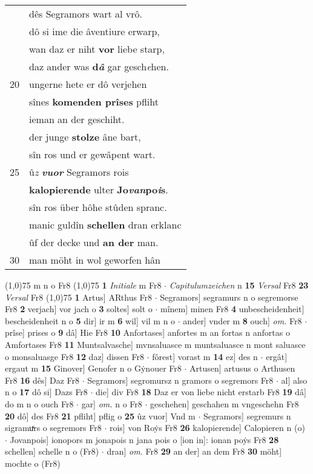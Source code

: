 \documentclass[8pt,a4paper,notitlepage]{article}
\begin{document}
\begin{table}[ht]
\begin{minipage}[t]{0.5\linewidth}
\begin{tabular}{rl}
 & dês Segramors wart al vrô.\\ 
 & dô si ime die âventiure erwarp,\\ 
 & wan daz er niht \textbf{vor} liebe starp,\\ 
 & daz ander was \textbf{d\textit{â}} gar gesch\textit{e}hen.\\ 
20 & ungerne hete er dô verjehen\\ 
 & sînes \textbf{komenden prîses} pfliht\\ 
 & ieman an der geschiht.\\ 
 & der junge \textbf{stolze} âne bart,\\ 
 & sîn ros und er gewâpent wart.\\ 
25 & û\textit{z} \textit{\textbf{vuor}} Segramors rois\\ 
 & \textbf{kalopierende} ulter \textbf{Jo\textit{van}po\textit{i}s}.\\ 
 & sîn ros über hôhe stûden spranc.\\ 
 & manic guldîn \textbf{schellen} dran erklanc\\ 
 & ûf der decke und \textbf{an der} man.\\ 
30 & man möht in wol geworfen hân\\ 
\end{tabular}
\scriptsize
\line(1,0){75} \newline
m n o Fr8 \newline
\line(1,0){75} \newline
\textbf{1} \textit{Initiale} m Fr8   $\cdot$ \textit{Capitulumzeichen} n  \textbf{15} \textit{Versal} Fr8  \textbf{23} \textit{Versal} Fr8  \newline
\line(1,0){75} \newline
\textbf{1} Artus] ARthus Fr8  $\cdot$ Segramors] segramurs n o segremorse Fr8 \textbf{2} verjach] vor jach o \textbf{3} soltes] solt o  $\cdot$ mînem] minen Fr8 \textbf{4} unbescheidenheit] bescheidenheit n o \textbf{5} dir] ir m \textbf{6} wil] vil m n o  $\cdot$ ander] vnder m \textbf{8} ouch] \textit{om.} Fr8  $\cdot$ prîse] prises o \textbf{9} dâ] Hie Fr8 \textbf{10} Anfortases] anfortes m an fortas n anfortas o Amfortases Fr8 \textbf{11} Muntsalvasche] mvnsaluasce m muntsaluasce n mont saluasce o monsaluasge Fr8 \textbf{12} daz] dissen Fr8  $\cdot$ fôrest] vorast m \textbf{14} ez] des n  $\cdot$ ergât] ergaut m \textbf{15} Ginover] Genofer n o Gẏnouer Fr8  $\cdot$ Artusen] artusus o Arthusen Fr8 \textbf{16} dês] Daz Fr8  $\cdot$ Segramors] segromursz n gramors o segremors Fr8  $\cdot$ al] also n o \textbf{17} dô si] Dazs Fr8  $\cdot$ die] div Fr8 \textbf{18} Daz er von liebe nicht erstarb Fr8 \textbf{19} dâ] do m n o ouch Fr8  $\cdot$ gar] \textit{om.} n o Fr8  $\cdot$ geschehen] geschahen m vngeschehn Fr8 \textbf{20} dô] des Fr8 \textbf{21} pfliht] pflig o \textbf{25} ûz vuor] Vnd m  $\cdot$ Segramors] segremurs n sigramuͯrs o segremors Fr8  $\cdot$ rois] von Roẏs Fr8 \textbf{26} kalopierende] Calopieren n (o)  $\cdot$ Jovanpois] ionopors m jonapois n jana pois o [ion in]: ionan poẏs Fr8 \textbf{28} schellen] schelle n o (Fr8)  $\cdot$ dran] \textit{om.} Fr8 \textbf{29} an der] an dem Fr8 \textbf{30} möht] mochte o (Fr8) \newline

\end{minipage}
\end{table}
\end{document}

